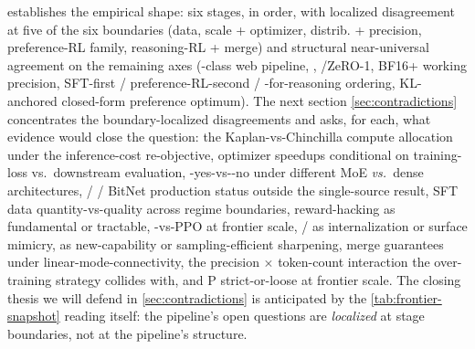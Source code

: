  establishes the empirical shape:
six stages, in order, with localized disagreement at five of the six
boundaries (data, scale + optimizer, distrib. + precision,
preference-RL family, reasoning-RL + merge) and structural
near-universal agreement on the remaining axes (-class web
pipeline, , /ZeRO-1, BF16+ working precision, SFT-first /
preference-RL-second / -for-reasoning ordering,
KL-anchored closed-form preference optimum). The next section
\cref{sec:contradictions} concentrates the boundary-localized
disagreements and asks, for each, what evidence would close the
question: the Kaplan-vs-Chinchilla compute allocation under the
inference-cost re-objective, optimizer speedups conditional on
training-loss vs.\ downstream evaluation, -yes-vs--no
under different MoE \emph{vs.\ }dense architectures,  /  /
BitNet production status outside the  single-source
result, SFT data quantity-vs-quality across regime boundaries,
reward-hacking as fundamental or tractable, -vs-PPO at frontier
scale,  /  as internalization or surface mimicry,  as
new-capability or sampling-efficient sharpening, merge guarantees
under linear-mode-connectivity, the precision $\times$ token-count
interaction the over-training strategy collides with, and \textmu P
strict-or-loose at frontier scale. The closing thesis we will
defend in \cref{sec:contradictions} is anticipated by the
\cref{tab:frontier-snapshot} reading itself: the pipeline's open
questions are \emph{localized} at stage boundaries, not at the
pipeline's structure.
